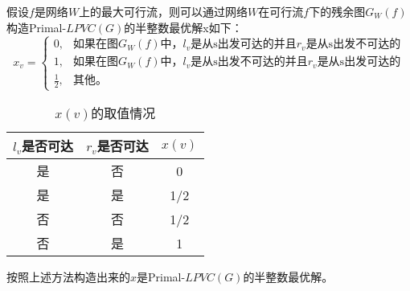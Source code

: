 假设$f$是网络$W$上的最大可行流，则可以通过网络$W$在可行流$f$下的残余图$G_W(f)$构造Primal-$LPVC(G)$的半整数最优解x如下：
\begin{equation*}
  x_v = \begin{cases}
            0, & \mbox{如果在图$G_W(f)$中，$l_v$是从s出发可达的并且$r_v$是从s出发不可达的}  \\
            1, & \mbox{如果在图$G_W(f)$中，$l_v$是从s出发不可达的并且$r_v$是从s出发可达的}  \\
            \frac{1}{2}, & \mbox{其他。}
          \end{cases}
\end{equation*}

\begin {table}[H]
\caption {$x(v)$的取值情况} \label{tab:x_v}
\begin{center}
\begin{tabular}
{|c|c|c|}
\toprule[1.5pt]
\bf $l_v$是否可达  & \bf $r_v$是否可达 & \bf $x(v)$ \\
\midrule
是  & 否 & 0\\
是  & 是 & 1/2\\
否  & 否 & 1/2\\
否  & 是 & 1\\
\bottomrule[1.25pt]
\end {tabular}
\end{center}
\end {table}

\begin{lemma}
按照上述方法构造出来的$x$是Primal-$LPVC(G)$的半整数最优解。
\end{lemma}

